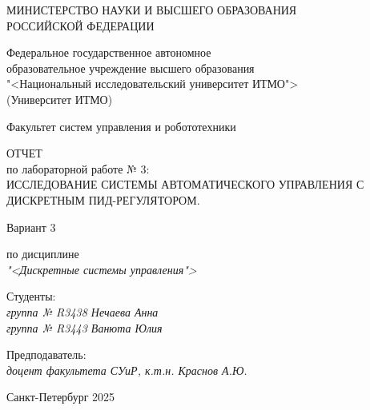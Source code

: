\thispagestyle{empty}

\begin{center}
    МИНИСТЕРСТВО НАУКИ И ВЫСШЕГО ОБРАЗОВАНИЯ \\ РОССИЙСКОЙ ФЕДЕРАЦИИ

    \vspace{20pt}

    Федеральное государственное автономное \\ образовательное учреждение высшего образования \\
    "<Национальный исследовательский университет ИТМО"> \\
    (Университет ИТМО)

    \vspace{20pt}

    Факультет систем управления и робототехники 
\end{center}

\vfill

\begin{center}
	ОТЧЕТ \\  
	по лабораторной работе № 3: \\
	\uppercase{Исследование системы автоматического управления с дискретным ПИД-регулятором.}
	\vspace{20pt}
	
	Вариант 3 \\
	
	\vspace{20pt}
	
	по дисциплине \\
	\textit{"<Дискретные системы управления">}
	
\end{center}

\vfill

\noindent Студенты: \\
\textit{группа № R3438 \hfill Нечаева Анна}\\
\textit{группа № R3443 \hfill Ванюта Юлия}

\vspace{20pt}

\noindent Предподаватель: \\
\textit{доцент факультета СУиР, к.т.н. \hfill Краснов А.Ю.}

\vfill

\begin{center}
    Санкт-Петербург 2025
\end{center}